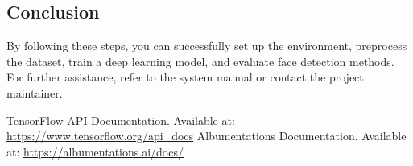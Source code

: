 \documentclass[a4paper]{feidippp}
\begin{document}
\subsection{Conclusion}

By following these steps, you can successfully set up the environment, preprocess the dataset, train a deep learning model, and evaluate face detection methods. For further assistance, refer to the system manual or contact the project maintainer.


\newpage
{}
\listoffigures

\listoftables


\def\refname{References}

\begin{thebibliography}{999}
     TensorFlow API Documentation. Available at: \url{https://www.tensorflow.org/api_docs}
     Albumentations Documentation. Available at: \url{https://albumentations.ai/docs/}
\end{thebibliography}
\end{document}
